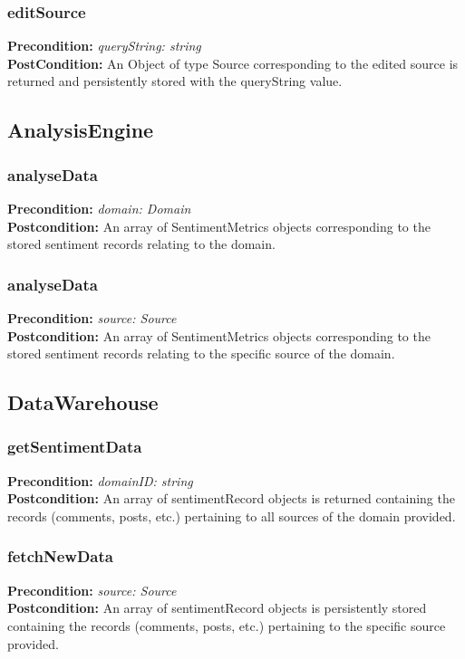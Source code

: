 \documentclass[12pt]{article}
\begin{document}
\subsubsection*{editSource}
\textbf{Precondition:} \textit{queryString: string} \\
\textbf{PostCondition:} An Object of type Source corresponding to the edited source is returned and persistently stored with the queryString value.

\subsection{AnalysisEngine}

\subsubsection*{analyseData}
\textbf{Precondition:} \textit{domain: Domain} \\
\textbf{Postcondition:} An array of SentimentMetrics objects corresponding to the stored sentiment records relating to the domain.

\subsubsection*{analyseData}
\textbf{Precondition:} \textit{source: Source} \\
\textbf{Postcondition:} An array of SentimentMetrics objects corresponding to the stored sentiment records relating to the specific source of the domain.

\subsection{DataWarehouse}

\subsubsection*{getSentimentData}
\textbf{Precondition:} \textit{domainID: string} \\
\textbf{Postcondition:} An array of sentimentRecord objects is returned containing the records (comments, posts, etc.) pertaining to all sources of the domain provided.

\subsubsection*{fetchNewData}
\textbf{Precondition:} \textit{source: Source} \\
\textbf{Postcondition:} An array of sentimentRecord objects is persistently stored containing the records (comments, posts, etc.) pertaining to the specific source provided.
\end{document}
